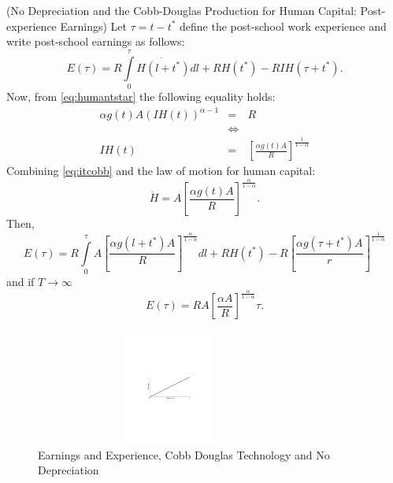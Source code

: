 \begin{example} (No Depreciation and the Cobb-Douglas Production for Human Capital: Post-experience Earnings)
Let $\tau = t - t^*$ define the post-school work experience and write post-school earnings as follows:
\begin{equation}
E(\tau) = R \int \limits _{0} ^{\tau} \dot{H( l + t^*)}d l + R H(t^*) - RIH(\tau + t^*).
\end{equation}
Now, from \eqref{eq:humantstar} the following equality holds:
\begin{eqnarray}
\alpha g(t) A \left( IH(t) \right)^{\alpha - 1} &=& R \nonumber \\
&\Leftrightarrow& \nonumber \\
IH(t) &=& \left[ \frac{\alpha g(t) A}{R} \right]^{\frac{1}{1-\alpha}} \label{eq:itcobb}
\end{eqnarray}
Combining \eqref{eq:itcobb} and the law of motion for human capital:
\begin{equation}
\dot{H} = A \left[ \frac{\alpha g(t) A}{R} \right]^{\frac{\alpha}{1-\alpha}} \label{eq:hdot}.
\end{equation}
Then,
\begin{equation}
E(\tau) = R \int \limits _{0} ^{\tau} A \left[ \frac{\alpha g(l + t^*) A}{R} \right]^{\frac{\alpha}{1-\alpha}} dl + RH(t^*) - R \left[ \frac{\alpha g \left( \tau + t^* \right) A}{r} \right]^{\frac{1}{1-\alpha}} \label{equation:postearnings}
\end{equation}
and if $T \rightarrow \infty$
\begin{equation}
E(\tau) = RA \left[ \frac{\alpha A}{R} \right]^{\frac{\alpha}{1-\alpha}} \tau.
\end{equation}

\begin{center}
\begin{figure}[H]
\caption{Earnings and Experience, Cobb Douglas Technology and No Depreciation}
\centering
\includegraphics[width=3.5in, height=1.5in]{Figures/fig-earnings-experience.pdf}
\end{figure}
\end{center}

\end{example}

